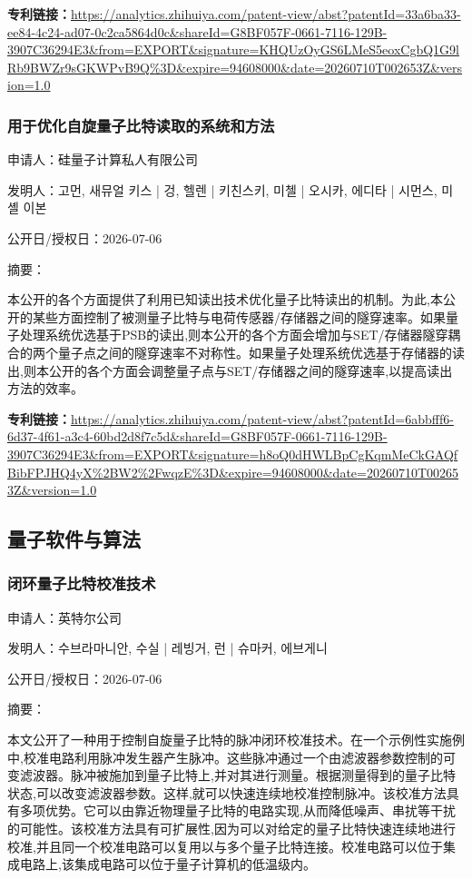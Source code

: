 \documentclass[12pt,a4paper]{ctexart}
\begin{document}
\noindent\textbf{专利链接：}\url{https://analytics.zhihuiya.com/patent-view/abst?patentId=33a6ba33-ee84-4c24-ad07-0c2ca5864d0c&shareId=G8BF057F-0661-7116-129B-3907C36294E3&from=EXPORT&signature=KHQUzOyGS6LMeS5eoxCgbQ1G9lRb9BWZr9sGKWPvB9Q%3D&expire=94608000&date=20260710T002653Z&version=1.0}

\subsubsection{ 用于优化自旋量子比特读取的系统和方法 }

申请人：硅量子计算私人有限公司

发明人：고먼, 새뮤얼 키스 | 겅, 헬렌 | 키친스키, 미첼 | 오시카, 에디타 | 시먼스, 미셸 이본

公开日/授权日：2026-07-06

摘要：

本公开的各个方面提供了利用已知读出技术优化量子比特读出的机制。为此,本公开的某些方面控制了被测量子比特与电荷传感器/存储器之间的隧穿速率。如果量子处理系统优选基于PSB的读出,则本公开的各个方面会增加与SET/存储器隧穿耦合的两个量子点之间的隧穿速率不对称性。如果量子处理系统优选基于存储器的读出,则本公开的各个方面会调整量子点与SET/存储器之间的隧穿速率,以提高读出方法的效率。

\noindent\textbf{专利链接：}\url{https://analytics.zhihuiya.com/patent-view/abst?patentId=6abbfff6-6d37-4f61-a3c4-60bd2d8f7c5d&shareId=G8BF057F-0661-7116-129B-3907C36294E3&from=EXPORT&signature=h8oQ0dHWLBpCgKqmMeCkGAQfBibFPJHQ4yX%2BW2%2FwqzE%3D&expire=94608000&date=20260710T002653Z&version=1.0}


\subsection{ 量子软件与算法 }

\subsubsection{ 闭环量子比特校准技术 }

申请人：英特尔公司

发明人：수브라마니안, 수실 | 레빙거, 런 | 슈마커, 에브게니

公开日/授权日：2026-07-06

摘要：

本文公开了一种用于控制自旋量子比特的脉冲闭环校准技术。在一个示例性实施例中,校准电路利用脉冲发生器产生脉冲。这些脉冲通过一个由滤波器参数控制的可变滤波器。脉冲被施加到量子比特上,并对其进行测量。根据测量得到的量子比特状态,可以改变滤波器参数。这样,​​就可以快速连续地校准控制脉冲。该校准方法具有多项优势。它可以由靠近物理量子比特的电路实现,从而降低噪声、串扰等干扰的可能性。该校准方法具有可扩展性,因为可以对给定的量子比特快速连续地进行校准,并且同一个校准电路可以复用以与多个量子比特连接。校准电路可以位于集成电路上,该集成电路可以位于量子计算机的低温级内。
\end{document}
